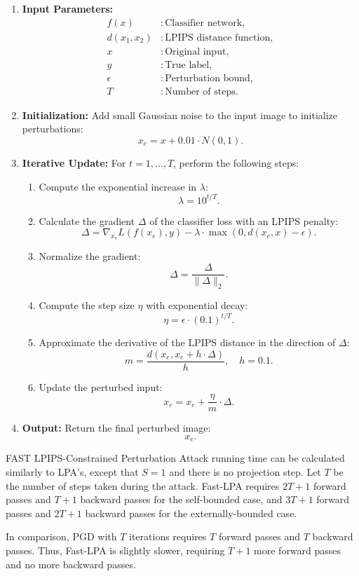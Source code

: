 \begin{enumerate}
    \item \textbf{Input Parameters:}  
    \begin{align*}
    f(x) &: \text{Classifier network}, \\
    d(x_1, x_2) &: \text{LPIPS distance function}, \\
    x &: \text{Original input}, \\
    y &: \text{True label}, \\
    \epsilon &: \text{Perturbation bound}, \\
    T &: \text{Number of steps}.
    \end{align*}

    \item \textbf{Initialization:}  
    Add small Gaussian noise to the input image to initialize perturbations:
    \[
    x_e = x + 0.01 \cdot N(0, 1).
    \]

    \item \textbf{Iterative Update:}  
    For $t = 1, \ldots, T$, perform the following steps:
    \begin{enumerate}
        \item Compute the exponential increase in $\lambda$:
        \[
        \lambda = 10^{t/T}.
        \]
        \item Calculate the gradient $\Delta$ of the classifier loss with an LPIPS penalty:
        \[
        \Delta = \nabla_{x_e} L(f(x_e), y) - \lambda \cdot \max \left(0, d(x_e, x) - \epsilon \right).
        \]
        \item Normalize the gradient:
        \[
        \Delta = \frac{\Delta}{\|\Delta\|_2}.
        \]
        \item Compute the step size $\eta$ with exponential decay:
        \[
        \eta = \epsilon \cdot (0.1)^{t/T}.
        \]
        \item Approximate the derivative of the LPIPS distance in the direction of $\Delta$:
        \[
        m = \frac{d(x_e, x_e + h \cdot \Delta)}{h}, \quad h = 0.1.
        \]
        \item Update the perturbed input:
        \[
        x_e = x_e + \frac{\eta}{m} \cdot \Delta.
        \]
    \end{enumerate}

    \item \textbf{Output:}  
    Return the final perturbed image:
    \[
    x_e.
    \]
\end{enumerate}

FAST LPIPS-Constrained Perturbation Attack running time can be calculated similarly to LPA's, except that $S = 1$ and there is no projection step. Let $T$ be the number of steps taken during the attack. Fast-LPA requires $2T + 1$ forward passes and $T + 1$ backward passes for the self-bounded case, and $3T + 1$ forward passes and $2T + 1$ backward passes for the externally-bounded case.

In comparison, PGD with $T$ iterations requires $T$ forward passes and $T$ backward passes. Thus, Fast-LPA is slightly slower, requiring $T + 1$ more forward passes and no more backward passes.
